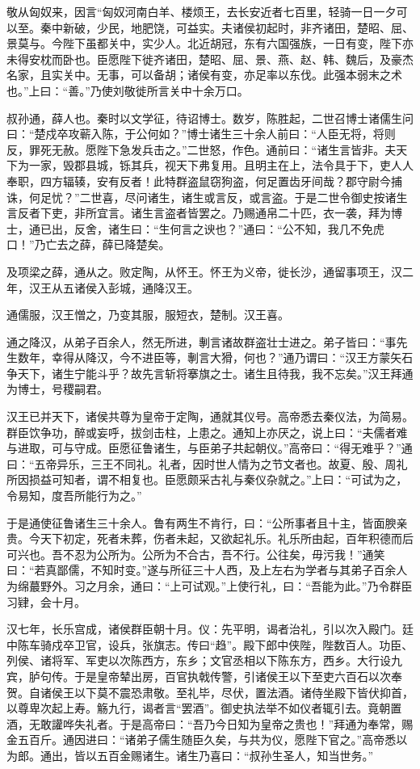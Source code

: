 \documentclass[]{article}
\begin{document}
敬从匈奴来，因言``匈奴河南白羊、楼烦王，去长安近者七百里，轻骑一日一夕可以至。秦中新破，少民，地肥饶，可益实。夫诸侯初起时，非齐诸田，楚昭、屈、景莫与。今陛下虽都关中，实少人。北近胡冠，东有六国强族，一日有变，陛下亦未得安枕而卧也。臣愿陛下徙齐诸田，楚昭、屈、景、燕、赵、韩、魏后，及豪杰名家，且实关中。无事，可以备胡；诸侯有变，亦足率以东伐。此强本弱末之术也。''上曰：``善。''乃使刘敬徙所言关中十余万口。

叔孙通，薛人也。秦时以文学征，待诏博士。数岁，陈胜起，二世召博士诸儒生问曰：``楚戍卒攻蕲入陈，于公何如？''博士诸生三十余人前曰：``人臣无将，将则反，罪死无赦。愿陛下急发兵击之。''二世怒，作色。通前曰：``诸生言皆非。夫天下为一家，毁郡县城，铄其兵，视天下弗复用。且明主在上，法令具于下，吏人人奉职，四方辐辏，安有反者！此特群盗鼠窃狗盗，何足置齿牙间哉？郡守尉今捕诛，何足忧？''二世喜，尽问诸生，诸生或言反，或言盗。于是二世令御史按诸生言反者下吏，非所宜言。诸生言盗者皆罢之。乃赐通帛二十匹，衣一袭，拜为博士，通已出，反舍，诸生曰：``生何言之谀也？''通曰：``公不知，我几不免虎口！''乃亡去之薛，薛已降楚矣。

及项梁之薛，通从之。败定陶，从怀王。怀王为义帝，徙长沙，通留事项王，汉二年，汉王从五诸侯入彭城，通降汉王。

通儒服，汉王憎之，乃变其服，服短衣，楚制。汉王喜。

通之降汉，从弟子百余人，然无所进，剸言诸故群盗壮士进之。弟子皆曰：``事先生数年，幸得从降汉，今不进臣等，剸言大猾，何也？''通乃谓曰：``汉王方蒙矢石争天下，诸生宁能斗乎？故先言斩将搴旗之士。诸生且待我，我不忘矣。''汉王拜通为博士，号稷嗣君。

汉王已并天下，诸侯共尊为皇帝于定陶，通就其仪号。高帝悉去秦仪法，为简易。群臣饮争功，醉或妄呼，拔剑击柱，上患之。通知上亦厌之，说上曰：``夫儒者难与进取，可与守成。臣愿征鲁诸生，与臣弟子共起朝仪。''高帝曰：``得无难乎？''通曰：``五帝异乐，三王不同礼。礼者，因时世人情为之节文者也。故夏、殷、周礼所因损益可知者，谓不相复也。臣愿颇采古礼与秦仪杂就之。''上曰：``可试为之，令易知，度吾所能行为之。''

于是通使征鲁诸生三十余人。鲁有两生不肯行，曰：``公所事者且十主，皆面腴亲贵。今天下初定，死者未葬，伤者未起，又欲起礼乐。礼乐所由起，百年积德而后可兴也。吾不忍为公所为。公所为不合古，吾不行。公往矣，毋污我！''通笑曰：``若真鄙儒，不知时变。''遂与所征三十人西，及上左右为学者与其弟子百余人为绵蕞野外。习之月余，通曰：``上可试观。''上使行礼，曰：``吾能为此。''乃令群臣习肄，会十月。

汉七年，长乐宫成，诸侯群臣朝十月。仪：先平明，谒者治礼，引以次入殿门。廷中陈车骑戍卒卫官，设兵，张旗志。传曰``趋''。殿下郎中侠陛，陛数百人。功臣、列侯、诸将军、军吏以次陈西方，东乡；文官丞相以下陈东方，西乡。大行设九宾，胪句传。于是皇帝辇出房，百官执戟传警，引诸侯王以下至吏六百石以次奉贺。自诸侯王以下莫不震恐肃敬。至礼毕，尽伏，置法酒。诸侍坐殿下皆伏抑首，以尊卑次起上寿。觞九行，谒者言``罢酒''。御史执法举不如仪者辄引去。竟朝置酒，无敢讙哗失礼者。于是高帝曰：``吾乃今日知为皇帝之贵也！''拜通为奉常，赐金五百斤。通因进曰：``诸弟子儒生随臣久矣，与共为仪，愿陛下官之。''高帝悉以为郎。通出，皆以五百金赐诸生。诸生乃喜曰：``叔孙生圣人，知当世务。''
\end{document}
